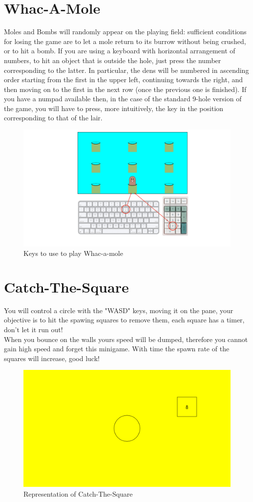 \documentclass[a4paper,12pt]{report}
\begin{document}
\section*{Whac-A-Mole}
Moles and Bombs will randomly appear on the playing field: sufficient conditions for losing the game are to let a mole return to its
burrow without being crushed, or to hit a bomb. If you are using a keyboard with horizontal arrangement of numbers, to hit an object that
is outside the hole, just press the number corresponding to the latter. In particular, the dens will be numbered in ascending order starting
from the first in the upper left, continuing towards the right, and then moving on to the first in the next row (once the previous one is
finished). If you have a numpad available then, in the case of the standard 9-hole version of the game, you will have to press, more intuitively,
the key in the position corresponding to that of the lair.
\begin{figure}[!htbp]
	\centering{}
	\includegraphics[width=\textwidth]{res/InstructionsWam.pdf}
	\caption{Keys to use to play Whac-a-mole}
\end{figure}
\section*{Catch-The-Square}
You will control a circle with the "WASD" keys, moving it on the pane, your objective is to hit the spawing squares to remove them, each square has a timer, don't let it run out!\\
When you bounce on the walls yours speed will be dumped, therefore you cannot gain high speed and forget this minigame.
With time the spawn rate of the squares will increase, good luck!
\begin{figure}[H]
	\centering{}
	\includegraphics[width=330pt]{res/Cts.png}
	\caption{Representation of Catch-The-Square}
\end{figure}
\end{document}
